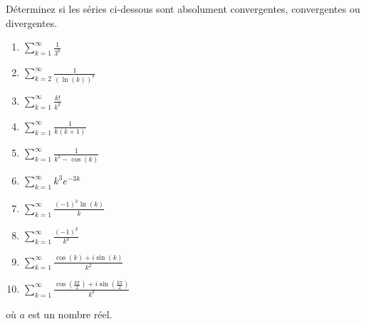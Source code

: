 
\begin{exercice}\label{exo0066}

Déterminez si les séries ci-dessous sont absolument convergentes, convergentes ou divergentes.
\begin{multicols}{2}
\begin{enumerate}
\item $ \sum_{k = 1}^{\infty} \frac{1}{3^k} $
\item $ \sum_{k=2}^{\infty} \frac{1}{(\ln(k))^k} $
\item $ \sum_{k = 1}^{\infty} \frac{k!}{k^k} $
\item $ \sum_{k = 1}^{\infty} \frac{1}{k(k+1)} $
\item $ \sum_{k = 1}^{\infty} \frac{1}{k^2- \cos(k)} $
\item $ \sum_{k = 1}^{\infty} k^3 e^{-3k} $
\item $ \sum_{k = 1}^{\infty} \frac{(-1)^k \ln(k)}{k} $
\item $ \sum_{k = 1}^{\infty} \frac{(-1)^k}{k^a} $
\item $ \sum_{k = 1}^{\infty} \frac{\cos(k) + i\sin(k)}{k^2} $
\item $ \sum_{k = 1}^{\infty} \frac{\cos(\frac{k\pi}{2}) + i \sin(\frac{k\pi}{2})}{k^a}$
\end{enumerate}
\end{multicols}
où $a$ est un nombre réel.

\end{exercice}
